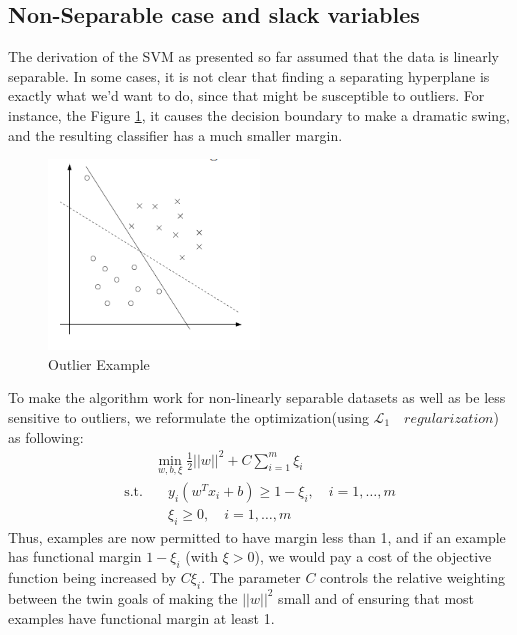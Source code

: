 \documentclass[a4paper]{article}
\begin{document}
\subsection{Non-Separable case and slack variables}
The derivation of the SVM as presented so far assumed that the data is linearly separable. In some cases, it is not clear that finding a separating hyperplane is exactly what we'd want to do, since that might be susceptible to outliers. For instance, the Figure \ref{fig:outlier}, it causes the decision boundary to make a dramatic swing, and the resulting classifier has a much smaller margin. 
\begin{figure}[h!]
  \centering
    \includegraphics[width=0.5\textwidth]{./images/outlier}
  \caption{Outlier Example}\label{fig:outlier}
\end{figure}

To make the algorithm work for non-linearly separable datasets as well as be less sensitive to outliers, we reformulate the optimization(using $\mathcal{L}_1 \quad regularization$) as following:
\begin{align*}
& \min_{w, b, \xi} \frac{1}{2} ||w||^2 + C \sum_{i=1}^{m}\xi_i\\
	\text{s.t.}  &\quad y_i (w^T x_i + b) \geq 1 - \xi_i, \quad i = 1, \dots, m \\
	& \quad \xi_i \geq 0, \quad i = 1, \dots, m  
\end{align*}
Thus, examples are now permitted to have margin less than 1, and if an example has functional margin $1-\xi_i$ (with $\xi > 0$), we would pay a cost of the objective function being increased by $C\xi_i$. The parameter $C$ controls the relative weighting between the twin goals of making the $||w||^2$ small and of ensuring that most examples have functional margin at least 1.\\
\end{document}
